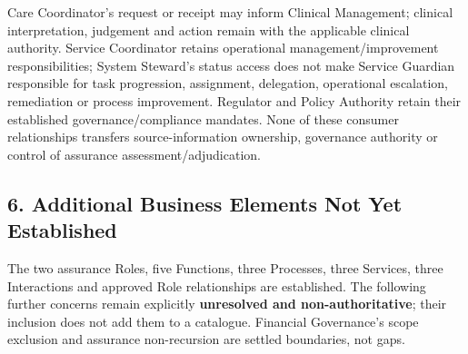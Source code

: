 Care Coordinator's request or receipt may inform Clinical Management; clinical interpretation, judgement and action remain with the applicable clinical authority. Service Coordinator retains operational management/\allowbreak{}improvement responsibilities; System Steward's status access does not make Service Guardian responsible for task progression, assignment, delegation, operational escalation, remediation or process improvement. Regulator and Policy Authority retain their established governance/\allowbreak{}compliance mandates. None of these consumer relationships transfers source-information ownership, governance authority or control of assurance assessment/\allowbreak{}adjudication.

\label{rad:assurance:212}



\label{rad:assurance:214}
\subsection*{6. Additional Business Elements Not Yet Established}
\label{rad:assurance:216}

The two assurance Roles, five Functions, three Processes, three Services, three Interactions and approved Role relationships are established. The following further concerns remain explicitly \textbf{unresolved and non-authoritative}; their inclusion does not add them to a catalogue. Financial Governance's scope exclusion and assurance non-recursion are settled boundaries, not gaps.

